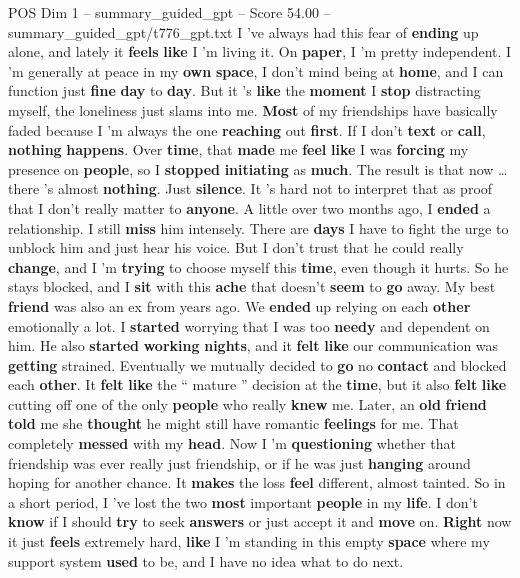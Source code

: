 \begin{textsample}{POS Dim 1 – summary\_guided\_gpt – Score 54.00 – summary\_guided\_gpt/t776\_gpt.txt}  \label{ex:f1_pos_024}
I ’ve always had this fear of \textbf{ending} up alone, and lately it \textbf{feels} \textbf{like} I ’m living it.
On \textbf{paper}, I ’m pretty independent.
I ’m generally at peace in my \textbf{own} \textbf{space}, I don't mind being at \textbf{home}, and I can function just \textbf{fine} \textbf{day} to \textbf{day}.
But it ’s \textbf{like} the \textbf{moment} I \textbf{stop} distracting myself, the loneliness just slams into me. \textbf{Most} of my friendships have basically faded because I ’m always the one \textbf{reaching} out \textbf{first}.
If I don't \textbf{text} or \textbf{call}, \textbf{nothing} \textbf{happens}.
Over \textbf{time}, that \textbf{made} me \textbf{feel} \textbf{like} I was \textbf{forcing} my presence on \textbf{people}, so I \textbf{stopped} \textbf{initiating} as \textbf{much}.
The result is that now … there ’s almost \textbf{nothing}.
Just \textbf{silence}.
It ’s hard not to interpret that as proof that I don't really matter to \textbf{anyone}.
A little over two months ago, I \textbf{ended} a relationship.
I still \textbf{miss} him intensely.
There are \textbf{days} I have to fight the urge to unblock him and just hear his voice.
But I don't trust that he could really \textbf{change}, and I ’m \textbf{trying} to choose myself this \textbf{time}, even though it hurts.
So he stays blocked, and I \textbf{sit} with this \textbf{ache} that doesn't \textbf{seem} to \textbf{go} away.
My best \textbf{friend} was also an ex from years ago.
We \textbf{ended} up relying on each \textbf{other} emotionally a lot.
I \textbf{started} worrying that I was too \textbf{needy} and dependent on him.
He also \textbf{started} \textbf{working} \textbf{nights}, and it \textbf{felt} \textbf{like} our communication was \textbf{getting} strained.
Eventually we mutually decided to \textbf{go} no \textbf{contact} and blocked each \textbf{other}.
It \textbf{felt} \textbf{like} the “ mature ” decision at the \textbf{time}, but it also \textbf{felt} \textbf{like} cutting off one of the only \textbf{people} who really \textbf{knew} me.
Later, an \textbf{old} \textbf{friend} \textbf{told} me she \textbf{thought} he might still have romantic \textbf{feelings} for me.
That completely \textbf{messed} with my \textbf{head}.
Now I ’m \textbf{questioning} whether that friendship was ever really just friendship, or if he was just \textbf{hanging} around hoping for another chance.
It \textbf{makes} the loss \textbf{feel} different, almost tainted.
So in a short period, I ’ve lost the two \textbf{most} important \textbf{people} in my \textbf{life}.
I don't \textbf{know} if I should \textbf{try} to seek \textbf{answers} or just accept it and \textbf{move} on. \textbf{Right} now it just \textbf{feels} extremely hard, \textbf{like} I ’m standing in this empty \textbf{space} where my support system \textbf{used} to be, and I have no idea what to do next.


\end{textsample}
